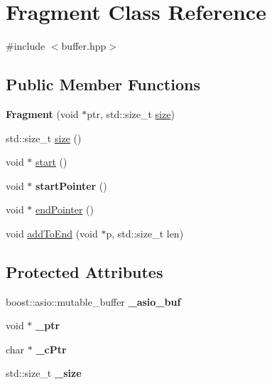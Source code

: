 \hypertarget{class_fragment}{}\section{Fragment Class Reference}
\label{class_fragment}


{\ttfamily \#include $<$buffer.\+hpp$>$}

\subsection*{Public Member Functions}
\begin{DoxyCompactItemize}
\item 
\mbox{\label{class_fragment_abde216ca67e496e9c38dddc8628f50d1}} 
{\bfseries Fragment} (void $\ast$ptr, std\+::size\+\_\+t \hyperlink{class_fragment_a02d9e89fe1680cc9e4b341b046e5b404}{size})
\item 
std\+::size\+\_\+t \hyperlink{class_fragment_a02d9e89fe1680cc9e4b341b046e5b404}{size} ()
\item 
void $\ast$ \hyperlink{class_fragment_a38a4c128d64a67316e1eda8f9c266eaf}{start} ()
\item 
\mbox{\label{class_fragment_abece0eeb1db72035f9eb576a894b28d4}} 
void $\ast$ {\bfseries start\+Pointer} ()
\item 
void $\ast$ \hyperlink{class_fragment_ab3bdf2bc0dc50407a572f48eced6b3f6}{end\+Pointer} ()
\item 
void \hyperlink{class_fragment_adabfe8ce7f415878540ded507c0e23cd}{add\+To\+End} (void $\ast$p, std\+::size\+\_\+t len)
\end{DoxyCompactItemize}
\subsection*{Protected Attributes}
\begin{DoxyCompactItemize}
\item 
\mbox{\label{class_fragment_a92f8306f6c46005e89a22acb3d313f31}} 
boost\+::asio\+::mutable\+\_\+buffer {\bfseries \+\_\+asio\+\_\+buf}
\item 
\mbox{\label{class_fragment_af35b9df30afda2df1228687e61a3ae74}} 
void $\ast$ {\bfseries \+\_\+ptr}
\item 
\mbox{\label{class_fragment_aa95c39ccc982e1f64bcd62a28e71c5ff}} 
char $\ast$ {\bfseries \+\_\+c\+Ptr}
\item 
\mbox{\label{class_fragment_a3e61ffb6aeef93ac860874b2e27120f0}} 
std\+::size\+\_\+t {\bfseries \+\_\+size}
\end{DoxyCompactItemize}


